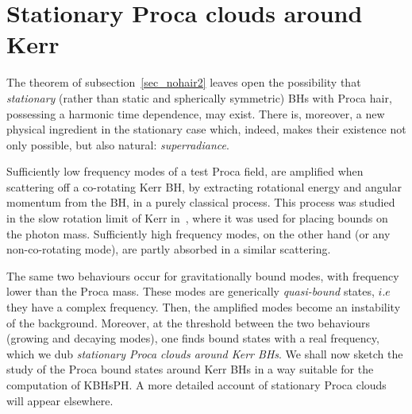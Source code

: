 \documentclass{article}
\numberwithin{equation}{section}
\begin{document}


 


\section{Stationary Proca clouds around Kerr}
\label{sec_clouds}
The theorem of subsection~\ref{sec_nohair2} leaves open the possibility that \textit{stationary} (rather than static and spherically symmetric) BHs with Proca hair, possessing a harmonic time dependence, may exist. There is, moreover, a new physical ingredient in the stationary case which, indeed, makes their existence not only possible, but also natural: \textit{superradiance}. 

Sufficiently low frequency modes of a test Proca field, are amplified when scattering off a co-rotating Kerr BH, by extracting rotational energy and angular momentum from the BH, in a purely classical process. This process was studied in the slow rotation limit of Kerr in~\cite{Pani:2012vp,Pani:2012bp}, where it was used for placing bounds on the photon mass. Sufficiently high frequency modes, on the other hand (or any non-co-rotating mode), are partly absorbed in a similar scattering. 

The same two behaviours occur for gravitationally bound modes, with frequency lower than the Proca mass. These modes are generically \textit{quasi-bound} states, $i.e$ they have a complex frequency. Then, the amplified modes become an instability of the background. Moreover, at the threshold between the two behaviours (growing and decaying modes), one finds bound states with a real frequency, which we dub \textit{stationary Proca clouds around Kerr BHs}. We shall now sketch the study of the Proca bound states around Kerr BHs in a way suitable for the computation of KBHsPH. A more detailed account of stationary Proca clouds will appear elsewhere. 
\end{document}
